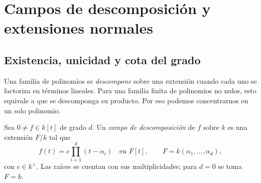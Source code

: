 \section{Campos de descomposición y extensiones normales}\label{sec:campos-normales}

\subsection{Existencia, unicidad y cota del grado}\label{tema:24-3-1}
Una familia de polinomios se \emph{descompone} sobre una extensión cuando cada uno se factoriza en términos lineales. Para una familia finita de polinomios no nulos, esto equivale a que se descomponga su producto. Por eso podemos concentrarnos en un solo polinomio.

\begin{defi}
Sea $0\ne f\in k[t]$ de grado $d$. Un \emph{campo de descomposición} de $f$ sobre $k$ es una extensión $F/k$ tal que
\[
f(t)=c\prod_{i=1}^d(t-\alpha_i)\quad\text{en }F[t],
\qquad F=k(\alpha_1,\ldots,\alpha_d),
\]
con $c\in k^\times$. Las raíces se cuentan con sus multiplicidades; para $d=0$ se toma $F=k$.
\end{defi}

